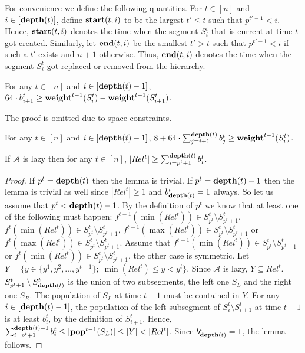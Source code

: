 \documentclass[runningheads,a4paper]{llncs}
\newcommand{\A}{\mathcal{A}}
\newcommand{\pop}{{\rm {\bf pop}}}
\newcommand{\weight}{{\rm {\bf weight}}}
\newcommand{\depth}{{\rm {\bf depth}}}
\newcommand{\starts}{{\rm {\bf start}}}
\newcommand{\sends}{{\rm {\bf end}}}
\begin{document}
For convenience we define the following quantities.
For $t\in[n]$ and $i\in[\depth(t)]$, define $\starts(t,i)$ to be the largest $t' \le t$ 
such that $p^{t'-1} < i$. Hence, $\starts(t,i)$ denotes the time when the segment $S^t_i$ that is current at time $t$ got created.
Similarly, let $\sends(t,i)$ be the smallest $t'>t$ such that $p^{t'-1} < i$ if such a $t'$ exists and $n+1$ otherwise.
Thus, $\sends(t,i)$ denotes the time when the segment $S^t_i$ got replaced or removed from the hierarchy. 

%


\begin{lemma}\label{l-p1}
For any $t\in[n]$ and $i\in[\depth(t)-1]$, $64\cdot b^t_{i+1} \ge \weight^{t-1}(S^t_i) - \weight^{t-1}(S^t_{i+1})$.
\end{lemma}

The proof is omitted due to space constraints.

\begin{corollary}\label{c-weight}
For any $t\in[n]$ and $i\in[\depth(t)-1]$, $8 + 64 \cdot \sum_{j=i+1}^{\depth(t)} b^t_{j} \ge \weight^{t-1}(S^t_i)$.
\end{corollary}


\begin{lemma}
If $\A$ is lazy then for any $t\in[n]$, $|Rel^t| \ge \sum_{i=p^t+1}^{\depth(t)} b^t_i$.
\end{lemma}

\begin{proof}
If $p^t = \depth(t)$ then the lemma is trivial. If $p^t = \depth(t)-1$ then the lemma is trivial as well
since $|Rel^t|\ge 1$ and $b^t_{\depth(t)}=1$ always. So let us assume that $p^t < \depth(t)-1$.
By the definition of $p^t$ we know that at least one of the following must happen: $f^{t-1}(\min(Rel^t)) \in S^t_{p^t} \setminus S^t_{p^t+1}$, $f^{t}(\min(Rel^t)) \in S^t_{p^t} \setminus S^t_{p^t+1}$, $f^{t-1}(\max(Rel^t)) \in S^t_{p^t} \setminus S^t_{p^t+1}$ or $f^{t}(\max(Rel^t)) \in S^t_{p^t} \setminus S^t_{p^t+1}$. Assume that $f^{t-1}(\min(Rel^t)) \in S^t_{p^t} \setminus S^t_{p^t+1}$ or $f^{t}(\min(Rel^t)) \in S^t_{p^t} \setminus S^t_{p^t+1}$,
the other case is symmetric. Let $Y = \{ y \in \{y^1,y^2,\dots,y^{t-1}\};\; \min(Rel^t) \le y < y^t\}$. 
Since $\A$ is lazy,  $Y \subseteq Rel^t$. $S^t_{p^t+1} \setminus S^t_{\depth(t)}$ is the union of two subsegments, the left one $S_L$ and the right one $S_R$.
The population of $S_L$ at time $t-1$ must be contained in $Y$.
For any $i\in [\depth(t)-1]$, the population of the left subsegment of $S^t_i \setminus S^t_{i+1}$ at time $t-1$ is at least $b^t_i$, by the definition of $S^t_{i+1}$. 
Hence, $\sum_{i=p^t+1}^{\depth(t)-1} b^t_i \le |\pop^{t-1}(S_L)| \le |Y| < |Rel^t|$. Since $b^t_{\depth(t)}=1$, the lemma follows.
\end{proof}
\end{document}
